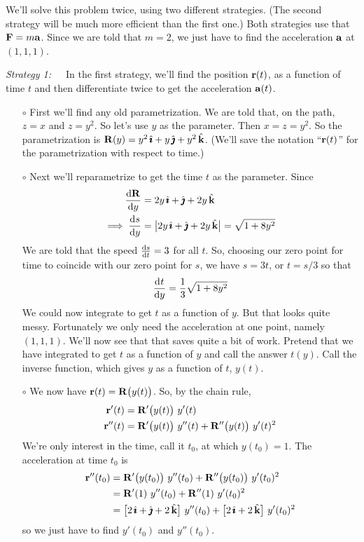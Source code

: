 \begin{solution} We'll solve this problem twice, using two different
strategies. (The second strategy will be much more efficient than 
the first one.)
Both strategies use that $\mathbf{F}=m\mathbf{a}$. Since we are told that 
$m=2$, we just have to find the acceleration $\mathbf{a}$ at $(1,1,1)$.

\noindent \emph{Strategy 1:}\ \ \ In the first strategy, we'll find 
the position $\mathbf{r}(t)$, as a function of time $t$ and then differentiate
twice to get the acceleration $\mathbf{a}(t)$. 

\begin{itemize}\itemsep1pt \parskip0pt  %
\item[$\circ$] First we'll find any old parametrization.
We are told that, on the path, $z=x$ and $z=y^2$. So let's use $y$ as the
parameter. Then $x=z=y^2$. So the parametrization is
$\mathbf{R}(y)=y^2\,\hat{\pmb{\imath}}+ y\,\hat{\pmb{\jmath}} +y^2\,\hat{\mathbf{k}}$. (We'll save the notation ``$\mathbf{r}(t)$''
for the parametrization with respect to time.)

\item[$\circ$] Next we'll reparametrize to get the time $t$ as the parameter.
Since 
\begin{align*}
\diff{\vR}{y} &= 2y\,\hi+\hj + 2y\,\hk \\
\implies \diff{s}{y} &=\big|2y\,\hi+\hj + 2y\,\hk\big|
                      =\sqrt{1+8y^2}
\end{align*}
We are told that the speed $\diff{s}{t}=3$ for all $t$.
So, choosing our zero point for time to coincide with our zero point 
for $s$, we have $s=3t$, or $t=s/3$ so that
\begin{equation*}
\diff{t}{y} =\frac{1}{3}\sqrt{1+8y^2}
\end{equation*}
We could now integrate to get $t$ as a function of $y$. But that
looks quite messy. Fortunately we only need the acceleration at one point,
namely $(1,1,1)$. We'll now see that that saves quite a bit of work.
Pretend that we have integrated to get $t$ as a function of $y$ and call the
answer $t(y)$. Call the inverse function, which gives $y$ as a function of $t$, $y(t)$. 

\item[$\circ$] We now have $\mathbf{r}(t) = \mathbf{R}\big(y(t)\big)$. 
So, by the chain rule,
\begin{align*}
\vr'(t) &= \vR'\big(y(t)\big)\ y'(t) \\
\vr''(t) &= \vR'\big(y(t)\big)\ y''(t) + \vR''\big(y(t)\big)\ y'(t)^2
\end{align*}
We're only interest in the time, call it $t_0$, at which $y(t_0)=1$.
The acceleration at time $t_0$ is
\begin{align*}
\mathbf{r}''(t_0) 
&= \mathbf{R}'\big(y(t_0)\big)\ y''(t_0) + \mathbf{R}''\big(y(t_0)\big)\ y'(t_0)^2 \\
& = \mathbf{R}'(1)\ y''(t_0) + \mathbf{R}''(1)\ y'(t_0)^2 \\
& = \big[2\,\hat{\pmb{\imath}}+\hat{\pmb{\jmath}} + 2\,\hat{\mathbf{k}}\big]\ y''(t_0) 
         + \big[2\,\hat{\pmb{\imath}}+ 2\,\hat{\mathbf{k}}\big]\ y'(t_0)^2 
\end{align*}
so we just have to find $y'(t_0)$ and $y''(t_0)$.


\end{itemize}
\end{solution}
